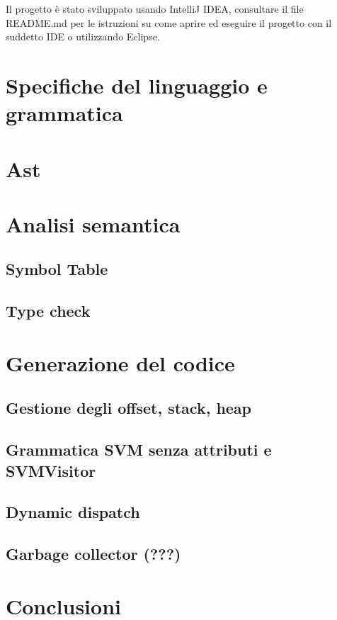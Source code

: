 \documentclass[a4paper]{article}   %
\begin{document}
Il progetto è stato sviluppato usando IntelliJ IDEA, consultare il file README.md per le istruzioni
su come aprire ed eseguire il progetto con il suddetto IDE o utilizzando Eclipse.

\section{Specifiche del linguaggio e grammatica}


\section{Ast}

\section{Analisi semantica}

\subsection{Symbol Table}
\subsection{Type check}

\section{Generazione del codice}

\subsection{Gestione degli offset, stack, heap}
\subsection{Grammatica SVM senza attributi e SVMVisitor}
\subsection{Dynamic dispatch}
\subsection{Garbage collector (???)}

\section{Conclusioni}

\begin{thebibliography}{9}
\end{thebibliography}
\end{document}
